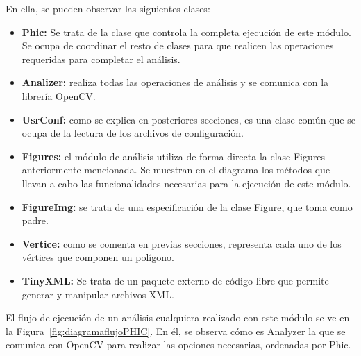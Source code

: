 En ella, se pueden observar las siguientes clases:\\

\begin{itemize}

	\item \textbf{Phic:} Se trata de la clase que controla la completa ejecución de este módulo. Se ocupa de coordinar el resto de clases para que realicen las operaciones requeridas para completar el análisis.
	
	\item \textbf{Analizer:} realiza todas las operaciones de análisis y se comunica con la librería OpenCV.
	
	\item \textbf{UsrConf:} como se explica en posteriores secciones, es una clase común que se ocupa de la lectura de los archivos de configuración.
	
	\item \textbf{Figures:} el módulo de análisis utiliza de forma directa la clase Figures anteriormente mencionada. Se muestran en el diagrama los métodos que llevan a cabo las funcionalidades necesarias para la ejecución de este módulo.
	
	\item \textbf{FigureImg:} se trata de una especificación de la clase Figure, que toma como padre.
	
	\item \textbf{Vertice:} como se comenta en previas secciones, representa cada uno de los vértices que componen un polígono. 
	
	\item \textbf{TinyXML:} Se trata de un paquete externo de código libre que permite generar y manipular archivos XML.
	
	
\end{itemize}
			
El flujo de ejecución de un análisis cualquiera realizado con este módulo se ve en la Figura~\ref{fig:diagramaflujoPHIC}. En él, se observa cómo es Analyzer la que se comunica con OpenCV para realizar las opciones necesarias, ordenadas por Phic.\\

